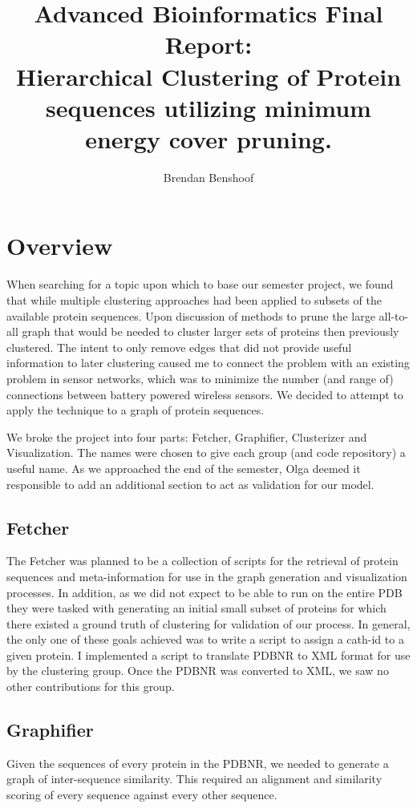 \documentclass[11pt]{article} %
\title{Advanced Bioinformatics Final Report: \\ Hierarchical Clustering of Protein sequences utilizing minimum energy cover pruning.}
\author{Brendan Benshoof}
\begin{document}
\maketitle
\section{Overview}
When searching for a topic upon which to base our semester project, we found that while multiple clustering approaches had been applied to subsets of the available protein sequences. Upon discussion of methods to prune the large all-to-all graph that would be needed to cluster larger sets of proteins then previously clustered. The intent to only remove edges that did not provide useful information to later clustering caused me to connect the problem with an existing problem in sensor networks, which was to minimize the number (and range of) connections between battery powered wireless sensors. We decided to attempt to apply the technique to a graph of protein sequences.

We broke the project into four parts: Fetcher, Graphifier, Clusterizer and Visualization. The names were chosen to give each group (and code repository) a useful name. As we approached the end of the semester, Olga deemed it responsible to add an additional section to act as validation for our model.

\subsection{Fetcher}
The Fetcher was planned to be a collection of scripts for the retrieval of protein sequences and meta-information for use in the graph generation and visualization processes. In addition, as we did not expect to be able to run on the entire PDB they were tasked with generating an initial small subset of proteins for which there existed a ground truth of clustering for validation of our process. In general, the only one of these goals achieved was to write a script to assign a cath-id to a given protein. I implemented a script to translate PDBNR to XML format for use by the clustering group. Once the PDBNR was converted to XML, we saw no other contributions for this group.
\subsection{Graphifier}
Given the sequences of every protein in the PDBNR, we needed to generate a graph of inter-sequence similarity. This required an alignment and similarity scoring of every sequence against every other sequence.
\end{document}
